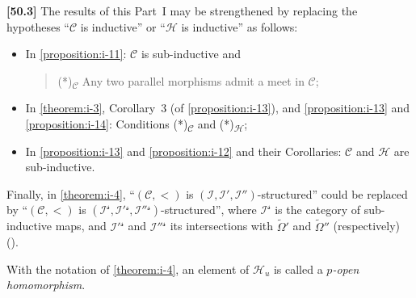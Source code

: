 \documentclass[a4paper,fleqn]{article}
\theoremstyle{plain}
\theoremstyle{definition}
\newenvironment{definition}[1]
  {\renewcommand\theinnerdefinition{#1}\innerdefinition}
  {\endinnerdefinition}
\newenvironment{longcomm}[1]
  {\noindent\textbf{[#1]}\rmfamily}
  {}
\newcommand{\oldpage}[1]{{\marginpar{\footnotesize$\bigg\vert$\,\,\,\,\textit{p.~#1}}}}
\newcommand{\CC}{\mathcal{C}}
\newcommand{\HH}{\mathcal{H}}
\newcommand{\II}{\mathcal{I}}
\begin{document}
\begin{longcomm}{50.3}
  The results of this Part~I may be strengthened by replacing the hypotheses ``$\CC$ is inductive'' or ``$\HH$ is inductive'' as follows:
  \begin{itemize}
    \item In \cref{proposition:i-11}:
      $\CC$ is sub-inductive and
      \begin{quote}
        (*)\textsubscript{$\CC$}
        Any two parallel morphisms admit a meet in $\CC$;
      \end{quote}

    \item In \cref{theorem:i-3}, Corollary~3 (of \cref{proposition:i-13}), and \cref{proposition:i-13} and \cref{proposition:i-14}:
      Conditions (*)\textsubscript{$\CC$} and (*)\textsubscript{$\HH$};

    \item In \cref{proposition:i-13} and \cref{proposition:i-12} and their Corollaries:
      $\CC$ and $\HH$ are sub-inductive.
  \end{itemize}

  Finally, in \cref{theorem:i-4}, ``$(\CC,<)$ is $(\II,\II',\II'')$-structured'' could be replaced by ``$(\CC,<)$ is $(\II^\mathcal{s},\II'{}^\mathcal{s},\II''{}^\mathcal{s})$-structured'', where $\II^\mathcal{s}$ is the category of sub-inductive maps, and $\II'{}^\mathcal{s}$ and $\II''{}^\mathcal{s}$ its intersections with $\widetilde{\Omega}'$ and $\widetilde{\Omega}''$ (respectively) (\cite{coll69}).
\end{longcomm}

\begin{definition}{10}
\label{definition:i-10}
  \oldpage{379}
  With the notation of \cref{theorem:i-4}, an element of $\HH_u$ is called a \emph{$p$-open homomorphism}.
\end{definition}
\end{document}
